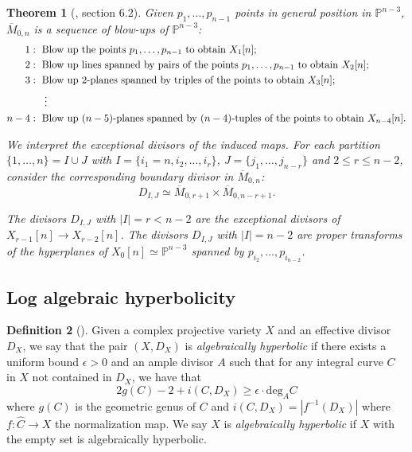 \documentclass{amsart}
\newtheorem{theorem}{Theorem}[section]
\theoremstyle{definition}
\newtheorem{definition}[theorem]{Definition}
\theoremstyle{remark}
\begin{document}
\begin{theorem}[\cite{hassett2002modulispacesweightedpointed}, section 6.2]\label{thm2}
Given $p_1,...,p_{n-1}$ points in general position in $\mathbb P^{n-3}$, $\overline{M}_{0,n}$ is a sequence of blow-ups of $\mathbb{P}^{n-3}$:
\begin{align*}
1 &: \text{ Blow up the points } p_1,\ldots,p_{n-1}\text{ to obtain }X_1[n];\\
2 &: \text{ Blow up lines spanned by pairs of the points }p_1,\ldots,p_{n-1} \text{ to obtain }X_2[n];\\
3 &: \text{ Blow up 2-planes spanned by triples of the points to obtain }X_3[n];\\
 & \hspace{0.5cm}\vdots\\
n-4 &: \text{ Blow up }(n-5)\text{-planes spanned by }(n-4)\text{-tuples of the points to obtain }X_{n-4}[n].
\end{align*}

We interpret the exceptional divisors of the induced maps. For each partition $\{1,\ldots,n\} = I \cup J$ with $I = \{i_1 = n, i_2,\ldots,i_r\}$, $J = \{j_1,\ldots,j_{n-r}\}$ and $2 \leq r \leq n-2$, consider the corresponding boundary divisor in $\overline{M}_{0,n}$: \[ D_{I,J} \simeq \overline{M}_{0,r+1} \times \overline{M}_{0,n-r+1}. \]

The divisors $D_{I,J}$ with $|I| = r < n-2$ are the exceptional divisors of $X_{r-1}[n] \to X_{r-2}[n]$. The divisors $D_{I,J}$ with $|I| = n-2$ are proper transforms of the hyperplanes of $X_0[n] \simeq \mathbb{P}^{n-3}$ spanned by $p_{i_2},\ldots,p_{i_{n-2}}$.
\end{theorem}


\subsection{Log algebraic hyperbolicity}




\begin{definition}[{\cite[Definition 1.10]{chen2001algebraichyperbolicitylogvarieties}}]
     Given a complex projective variety $X$ and an effective divisor $D_X$, we say that the pair $(X,D_X)$ is \emph{algebraically hyperbolic} if there exists a uniform bound $\epsilon>0$ and an ample divisor $A$ such that for any integral curve $C$ in $X$ not contained in $D_X$, we have that \[2g(C)-2+i(C,D_X) \geq \epsilon\cdot \mathrm{deg}_A C\]where $g(C)$ is the geometric genus of $C$ and $i(C,D_X) = |f^{-1}(D_X)|$ where $f:\widehat{C}\rightarrow X$ the normalization map. We say $X$ is \emph{algebraically hyperbolic} if $X$ with the empty set is algebraically hyperbolic. 
\end{definition}
\end{document}
